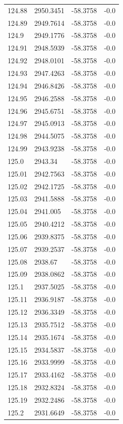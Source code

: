 \begin{table}[H]
\begin{tabular}{llll}
124.88 & 2950.3451 & -58.3758 & -0.0 \\
124.89 & 2949.7614 & -58.3758 & -0.0 \\
124.9 & 2949.1776 & -58.3758 & -0.0 \\
124.91 & 2948.5939 & -58.3758 & -0.0 \\
124.92 & 2948.0101 & -58.3758 & -0.0 \\
124.93 & 2947.4263 & -58.3758 & -0.0 \\
124.94 & 2946.8426 & -58.3758 & -0.0 \\
124.95 & 2946.2588 & -58.3758 & -0.0 \\
124.96 & 2945.6751 & -58.3758 & -0.0 \\
124.97 & 2945.0913 & -58.3758 & -0.0 \\
124.98 & 2944.5075 & -58.3758 & -0.0 \\
124.99 & 2943.9238 & -58.3758 & -0.0 \\
125.0 & 2943.34 & -58.3758 & -0.0 \\
125.01 & 2942.7563 & -58.3758 & -0.0 \\
125.02 & 2942.1725 & -58.3758 & -0.0 \\
125.03 & 2941.5888 & -58.3758 & -0.0 \\
125.04 & 2941.005 & -58.3758 & -0.0 \\
125.05 & 2940.4212 & -58.3758 & -0.0 \\
125.06 & 2939.8375 & -58.3758 & -0.0 \\
125.07 & 2939.2537 & -58.3758 & -0.0 \\
125.08 & 2938.67 & -58.3758 & -0.0 \\
125.09 & 2938.0862 & -58.3758 & -0.0 \\
125.1 & 2937.5025 & -58.3758 & -0.0 \\
125.11 & 2936.9187 & -58.3758 & -0.0 \\
125.12 & 2936.3349 & -58.3758 & -0.0 \\
125.13 & 2935.7512 & -58.3758 & -0.0 \\
125.14 & 2935.1674 & -58.3758 & -0.0 \\
125.15 & 2934.5837 & -58.3758 & -0.0 \\
125.16 & 2933.9999 & -58.3758 & -0.0 \\
125.17 & 2933.4162 & -58.3758 & -0.0 \\
125.18 & 2932.8324 & -58.3758 & -0.0 \\
125.19 & 2932.2486 & -58.3758 & -0.0 \\
125.2 & 2931.6649 & -58.3758 & -0.0 \\

\end{tabular}
\end{table}

